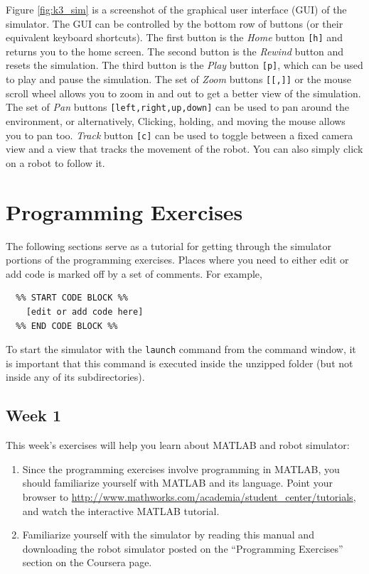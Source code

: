\documentclass[10pt]{article}
\begin{document}
Figure \ref{fig:k3_sim} is a screenshot of the graphical user interface (GUI) of the simulator. The GUI can be controlled by the bottom row of buttons (or their equivalent keyboard shortcuts). The first button is the \textit{Home} button \texttt{[h]} and returns you to the home screen. The second button is the \textit{Rewind} button and resets the simulation. The third button is the \textit{Play} button \texttt{[p]}, which can be used to play and pause the simulation. The set of \textit{Zoom} buttons \texttt{[[,]]} or the mouse scroll wheel allows you to zoom in and out to get a better view of the simulation. The set of \textit{Pan} buttons \texttt{[left,right,up,down]} can be used to pan around the environment, or alternatively, Clicking, holding, and moving the mouse allows you to pan too. \textit{Track} button \texttt{[c]} can be used to toggle between a fixed camera view and a view that tracks the movement of the robot. You can also simply click on a robot to follow it.

\newpage
\section{Programming Exercises}

The following sections serve as a tutorial for getting through the simulator portions of the programming exercises. Places where you need to either edit or add code is marked off by a set of comments. For example,

\begin{verbatim}
  %% START CODE BLOCK %%
    [edit or add code here]
  %% END CODE BLOCK %%
\end{verbatim}

To start the simulator with the \texttt{launch} command from the command window, it is important that this command is executed inside the unzipped folder (but not inside any of its subdirectories).

\subsection{Week 1}

This week's exercises will help you learn about MATLAB and robot simulator:

\begin{enumerate}
\item Since the programming exercises involve programming in MATLAB, you should familiarize yourself with MATLAB and its language. Point your browser to \url{http://www.mathworks.com/academia/student_center/tutorials}, and watch the interactive MATLAB tutorial.

\item Familiarize yourself with the simulator by reading this manual and downloading the robot simulator posted on the ``Programming Exercises'' section on the Coursera page.
\end{enumerate}
\end{document}
